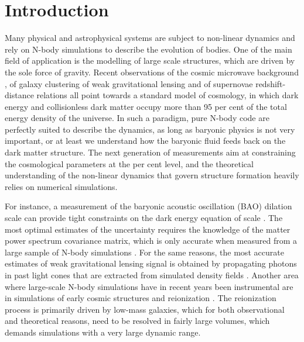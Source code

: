 \section{Introduction}

Many physical and astrophysical systems are subject to non-linear dynamics
and rely on N-body simulations to describe the evolution of bodies. 
One of the main field of application is the modelling of large scale structures, 
which are driven by the sole force of gravity. Recent observations of the 
cosmic microwave background \citep{WMAP5-7}, of galaxy clustering 
\citep{2000AJ....120.1579Y, 2003astro.ph..6581C, 2009arXiv0902.4680S, 
2010MNRAS.401.1429D} of weak gravitational lensing \citep{CFHTLS, SDSS}
and of supernovae redshift-distance relations all point towards a standard 
model of cosmology, in which dark energy and collisionless dark matter occupy 
more than 95 per cent of the total energy density of the universe. In such a 
paradigm, pure N-body code are perfectly suited to describe the dynamics, as 
long as baryonic physics is not very important, or at least we understand how 
the baryonic fluid feeds back on the dark matter structure. The next generation 
of measurements aim at constraining the cosmological parameters at the per cent 
level, and the theoretical understanding of the non-linear dynamics that govern 
structure formation heavily relies on numerical simulations. 

For instance, a measurement of the baryonic acoustic oscillation (BAO) dilation 
scale can provide tight constraints on the dark energy equation of scale 
\citep{Seo2003,2005}. The most optimal estimates of the uncertainty requires the 
knowledge of the matter power spectrum covariance matrix, which is only accurate 
when measured from a large sample of N-body simulations \citep{2005MNRAS.360L..82R, 
2009ApJ...700..479T, 2011ApJ...726....7T}. For the same reasons, the most accurate 
estimates of weak gravitational lensing signal is obtained by propagating photons 
in past light cones that are extracted from simulated density fields 
\citep{2003ApJ...592..699V, 2009ApJ...701..945S, 2009A&A...499...31H}.
Another area where large-scale N-body simulations have in recent years been 
instrumental are in simulations of early cosmic structures and reionization 
\citep[e.g.][]{2006MNRAS.369.1625I,2007ApJ...654...12Z,2007ApJ...671....1T,
2011arXiv1107.4772I}. The reionization process is primarily driven by low-mass 
galaxies, which for both observational and theoretical reasons, need to be resolved 
in fairly large volumes, which demands simulations with a very large dynamic range.   

